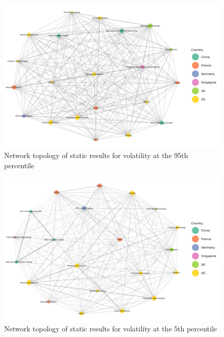 \documentclass[
  letterpaper,
  DIV=11,
  numbers=noendperiod]{scrartcl}
\begin{document}
\begin{figure}[H]

{\centering \includegraphics[width=6.75in,height=\textheight]{plots/fig-vol95.png}

}

\caption{\label{fig-vol95}Network topology of static results for
volatility at the 95th percentile}

\end{figure}

\begin{figure}[H]

{\centering \includegraphics[width=6.75in,height=\textheight]{plots/fig-vol5.png}

}

\caption{\label{fig-vol5}Network topology of static results for
volatility at the 5th percentile}

\end{figure}
\end{document}
